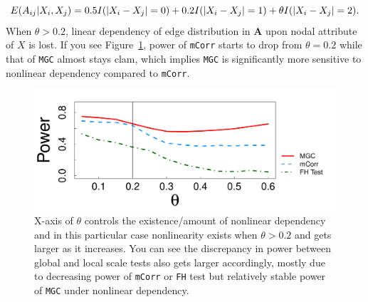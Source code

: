 \documentclass[11pt]{article}
\theoremstyle{definition}
\begin{document}
\begin{equation}
E(A_{ij} | X_{i}, X_{j}) = 0.5 I(|X_{i} - X_{j}| = 0) + 0.2 I(|X_{i} - X_{j}| = 1) + \theta I(|X_{i} - X_{j}| = 2).
\label{eq:mono}
\vspace*{-0.4cm}
\end{equation}
When $\theta > 0.2$, linear dependency of edge distribution in $\mathbf{A}$ upon nodal attribute of $X$ is lost. If you see Figure~\ref{fig:powerplot}, power of \texttt{mCorr} starts to drop from $\theta = 0.2$ while that of \texttt{MGC} almost stays clam, which implies \texttt{MGC} is significantly more sensitive to nonlinear dependency compared to \texttt{mCorr}.  
\begin{figure}[h]
	\centering
	\includegraphics[width=0.7\linewidth]{../Figure/mono_simple.pdf}
	\caption{X-axis of $\theta$ controls the existence/amount of nonlinear dependency and in this particular case nonlinearity exists when $\theta > 0.2$ and gets larger as it increases. You can see the discrepancy in power between global and local scale tests also gets larger accordingly, mostly due to decreasing power of \texttt{mCorr} or \texttt{FH} test but relatively stable power of \texttt{MGC} under nonlinear dependency.}
	\label{fig:powerplot}
\end{figure}
\end{document}
